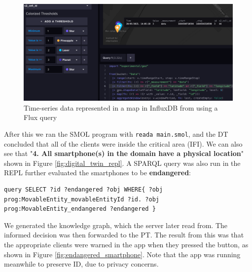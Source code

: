 \documentclass{article}
\begin{document}
\begin{figure}[H]
    \centering
    \includegraphics[scale=0.34]{graphics/influx_map.png}
    \caption{Time-series data represented in a map in InfluxDB from using a Flux query}
    \label{fig:influx_map}
\end{figure}

After this we ran the SMOL program with \verb|reada main.smol|, and the DT concluded that all of the clients were inside the critical area (IFI). We can also see that "\textbf{4. All smartphone(s) in the domain have a physical location}" shown in Figure \ref{fig:digital_twin_repl}. A SPARQL query was also run in the REPL further evaluated the smartphones to be \textbf{endangered}:

\begin{small}
\begin{Verbatim}[breaklines]
query SELECT ?id ?endangered ?obj WHERE{ ?obj prog:MovableEntity_movableEntityId ?id. ?obj prog:MovableEntity_endangered ?endangered }
\end{Verbatim}
\end{small}

We generated the knowledge graph, which the server later read from. The informed decision was then forwarded to the PT. The result from this was that the appropriate clients were warned in the app when they pressed the button, as shown in Figure \ref{fig:endangered_smartphone}. Note that the app was running meanwhile to preserve ID, due to privacy concerns.
\end{document}

